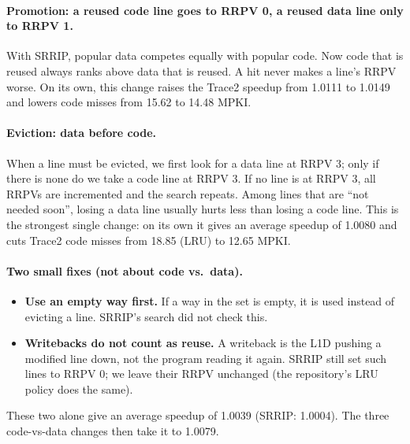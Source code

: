 \documentclass[11pt]{article}
\begin{document}
\paragraph{Promotion: a reused code line goes to RRPV 0, a reused data line only to RRPV 1.}
With SRRIP, popular data competes equally with popular code. Now code that is
reused always ranks above data that is reused. A hit never makes a line's RRPV
worse. On its own, this change raises the Trace2 speedup from 1.0111 to 1.0149
and lowers code misses from 15.62 to 14.48 MPKI.

\paragraph{Eviction: data before code.}
When a line must be evicted, we first look for a data line at RRPV 3; only if
there is none do we take a code line at RRPV 3. If no line is at RRPV 3, all
RRPVs are incremented and the search repeats. Among lines that are ``not needed
soon'', losing a data line usually hurts less than losing a code line. This is
the strongest single change: on its own it gives an average speedup of 1.0080
and cuts Trace2 code misses from 18.85 (LRU) to 12.65 MPKI.

\paragraph{Two small fixes (not about code vs.\ data).}
\label{sec:t2a-fixes}
\begin{itemize}
  \item \textbf{Use an empty way first.} If a way in the set is empty, it is
        used instead of evicting a line. SRRIP's search did not check this.
  \item \textbf{Writebacks do not count as reuse.} A writeback is the L1D
        pushing a modified line down, not the program reading it again. SRRIP
        still set such lines to RRPV 0; we leave their RRPV unchanged (the
        repository's LRU policy does the same).
\end{itemize}
These two alone give an average speedup of 1.0039 (SRRIP: 1.0004). The three
code-vs-data changes then take it to 1.0079.
\end{document}
